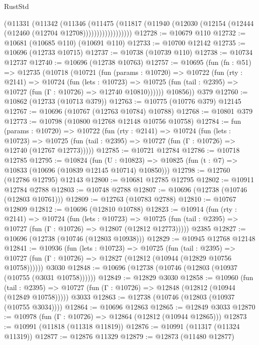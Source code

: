 \begin{lexlean}{RustStd}
\begin{coremodule}
                  (@11331
                    (@11342
                      (@11346
                        (@11475
                          (@11817
                            (@11940 (@12030 (@12154 (@12444 (@12460 (@12704 @12708))))))))))))))))))
@12728 := @10679 @110
@12732 := @10681 (@10685 @110) (@10691 @110)
@12733 := @10700 @12142
@12735 := @10696 (@12733 @10715)
@12737 := @10738 (@10739 @110)
@12738 := @10734 @12737
@12740 := @10696 (@12738 @10763)
@12757 := @10695
    (fun (fn : @51) =>
    @12735
      (@10718
        (@10721
          (fun (params : @10720) =>
          @10722
            (fun (rty : @2141) =>
            @10724
              (fun (lets : @10723) =>
              @10725 (fun (tail : @2395) => @10727 (fun (Γ : @10726) => @12740 @10810))))))
        @10856))
    @379
@12760 := @10862 (@12733 (@10713 @379))
@12763 := @10775 (@10776 @379) @12145
@12767 := @10696 (@10767 (@12763 @10784) @10788)
@12768 := @10801 @379
@12773 := @10798 (@10800 @12768 @12148 @10756 @10758)
@12784 := fun (params : @10720) =>
  @10722
    (fun (rty : @2141) =>
    @10724
      (fun (lets : @10723) =>
      @10725 (fun (tail : @2395) => @10727 (fun (Γ : @10726) => @12740 (@12767 @12773)))))
@12785 := @10721 @12784
@12786 := @10718 @12785
@12795 := @10824
    (fun (U : @10823) => @10825 (fun (t : @7) => @10833 (@10696 (@10839 @12145 @10714) @10850)))
@12798 := @12760 (@12786 @12795) @12143
@12800 := @10681 @12785 @12795
@12802 := @10911 @12784 @2788
@12803 := @10748 @2788
@12807 := @10696 (@12738 (@10746 (@12803 @10761)))
@12809 := @12763 (@10783 @2788)
@12810 := @10767 @12809
@12812 := @10696 (@12810 @10788)
@12823 := @10914
    (fun (rty : @2141) =>
    @10724
      (fun (lets : @10723) =>
      @10725 (fun (tail : @2395) => @10727 (fun (Γ : @10726) => @12807 (@12812 @12773)))))
    @2385
@12827 := @10696 (@12738 (@10746 (@12803 @10938)))
@12829 := @10945 @12768 @12148
@12841 := @10936
    (fun (lets : @10723) =>
    @10725
      (fun (tail : @2395) =>
      @10727 (fun (Γ : @10726) => @12827 (@12812 (@10944 (@12829 @10756 @10758))))))
    @3030
@12848 := @10696 (@12738 (@10746 (@12803 (@10937 (@10755 (@3031 @10758))))))
@12849 := @12829 @3030
@12858 := @10960
    (fun (tail : @2395) => @10727 (fun (Γ : @10726) => @12848 (@12812 (@10944 (@12849 @10758)))))
    @3033
@12863 := @12738 (@10746 (@12803 (@10937 (@10755 @3034))))
@12864 := @10696 @12863
@12865 := @12849 @3033
@12870 := @10978 (fun (Γ : @10726) => @12864 (@12812 (@10944 @12865)))
@12873 := @10991 (@11818 (@11318 @11819))
@12876 := @10991 (@11317 (@11324 @11319))
@12877 := @12876 @11329
@12879 := @12873 (@11480 @12877)

\end{coremodule}
\end{lexlean}
